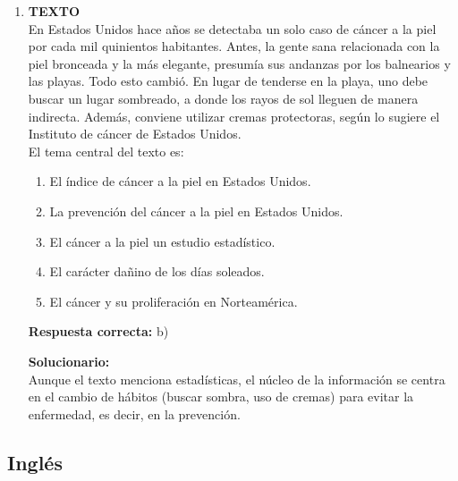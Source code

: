 \begin{enumerate}
	\vspace{2mm}
	\textbf{Solucionario:}\\
	El orden lógico es: Definición (II), antecedentes históricos iniciales (I), otro caso histórico similar (IV), uso general actual (III) y perspectiva futura/específica (V).
	
	\vspace{6mm}
	
	\item \textbf{TEXTO}\\
	En Estados Unidos hace años se detectaba un solo caso de cáncer a la piel por cada mil quinientos habitantes. Antes, la gente sana relacionada con la piel bronceada y la más elegante, presumía sus andanzas por los balnearios y las playas. Todo esto cambió. En lugar de tenderse en la playa, uno debe buscar un lugar sombreado, a donde los rayos de sol lleguen de manera indirecta. Además, conviene utilizar cremas protectoras, según lo sugiere el Instituto de cáncer de Estados Unidos. \\
	El tema central del texto es:
	\begin{enumerate}[label=\alph*)]
		\item El índice de cáncer a la piel en Estados Unidos.
		\item La prevención del cáncer a la piel en Estados Unidos.
		\item El cáncer a la piel un estudio estadístico.
		\item El carácter dañino de los días soleados.
		\item El cáncer y su proliferación en Norteamérica.
	\end{enumerate}
	\textbf{Respuesta correcta:} b)
	
	\vspace{2mm}
	\textbf{Solucionario:}\\
	Aunque el texto menciona estadísticas, el núcleo de la información se centra en el cambio de hábitos (buscar sombra, uso de cremas) para evitar la enfermedad, es decir, en la prevención.
	
	\vspace{6mm}
	
\end{enumerate}

\subsection*{Inglés}


